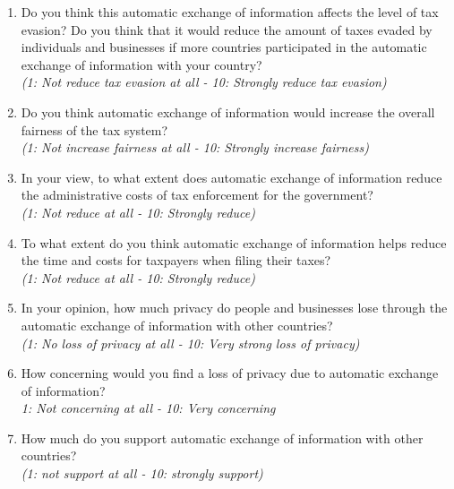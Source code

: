 \documentclass[11pt]{article}
\begin{document}
\begin{enumerate}[resume]
    \item Do you think this automatic exchange of information affects the level of tax evasion? Do you think that it would reduce the amount of taxes evaded by individuals and businesses if more countries participated in the automatic exchange of information with your country?\\
    \textit{(1: Not reduce tax evasion at all - 10: Strongly reduce tax evasion)} 
    \item Do you think automatic exchange of information would increase the overall fairness of the tax system? \\
    \textit{(1: Not increase fairness at all - 10: Strongly increase fairness)} 
    \item In your view, to what extent does automatic exchange of information reduce the administrative costs of tax enforcement for the government?\\
\textit{(1: Not reduce at all - 10: Strongly reduce)}
    \item To what extent do you think automatic exchange of information helps reduce the time and costs for taxpayers when filing their taxes?\\
\textit{(1: Not reduce at all - 10: Strongly reduce)}
    \item In your opinion, how much privacy do people and businesses lose through the automatic exchange of information  with other countries? \\
    \textit{(1: No loss of privacy at all - 10: Very strong loss of privacy)} 
    \item How concerning would you find a loss of privacy due to automatic exchange of information? \\ 
    \textit{1: Not concerning at all - 10: Very concerning}
    \item How much do you support automatic exchange of information with other countries? \\
    \textit{(1: not support at all - 10: strongly support)}
\end{enumerate}
\end{document}
